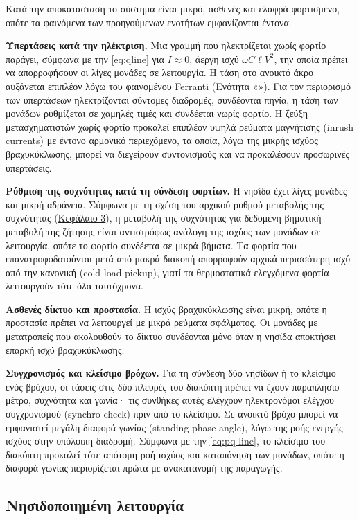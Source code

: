 Κατά την αποκατάσταση το σύστημα είναι μικρό, ασθενές και ελαφρά φορτισμένο, οπότε τα
φαινόμενα των προηγούμενων ενοτήτων εμφανίζονται έντονα.

\textbf{Υπερτάσεις κατά την ηλέκτριση.} Μια γραμμή που ηλεκτρίζεται χωρίς φορτίο παράγει,
σύμφωνα με την \eqref{eq:qline} για $I \approx 0$, άεργη ισχύ $\omega C \ell V^2$, την οποία
πρέπει να απορροφήσουν οι λίγες μονάδες σε λειτουργία. Η τάση στο ανοικτό άκρο αυξάνεται
επιπλέον λόγω του φαινομένου Ferranti (Ενότητα «»). Για τον περιορισμό
των υπερτάσεων ηλεκτρίζονται σύντομες διαδρομές, συνδέονται πηνία, η τάση των μονάδων
ρυθμίζεται σε χαμηλές τιμές και συνδέεται νωρίς φορτίο. Η ζεύξη μετασχηματιστών χωρίς φορτίο
προκαλεί επιπλέον υψηλά ρεύματα μαγνήτισης (inrush currents) με έντονο αρμονικό περιεχόμενο, τα οποία, λόγω της
μικρής ισχύος βραχυκύκλωσης, μπορεί να διεγείρουν συντονισμούς και να προκαλέσουν προσωρινές
υπερτάσεις.

\textbf{Ρύθμιση της συχνότητας κατά τη σύνδεση φορτίων.} Η νησίδα έχει λίγες μονάδες και μικρή
αδράνεια. Σύμφωνα με τη σχέση του αρχικού ρυθμού μεταβολής της συχνότητας
(\hyperref[kef-03-theoria]{Κεφάλαιο 3}), η μεταβολή της συχνότητας για δεδομένη βηματική
μεταβολή της ζήτησης είναι αντιστρόφως ανάλογη της ισχύος των μονάδων σε λειτουργία, οπότε το
φορτίο συνδέεται σε μικρά βήματα. Τα φορτία που επανατροφοδοτούνται μετά από μακρά διακοπή
απορροφούν αρχικά περισσότερη ισχύ από την κανονική (cold load pickup), γιατί τα θερμοστατικά
ελεγχόμενα φορτία λειτουργούν τότε όλα ταυτόχρονα.

\textbf{Ασθενές δίκτυο και προστασία.} Η ισχύς βραχυκύκλωσης είναι μικρή, οπότε η προστασία
πρέπει να λειτουργεί με μικρά ρεύματα σφάλματος. Οι μονάδες με
μετατροπείς που ακολουθούν το δίκτυο συνδέονται μόνο όταν η νησίδα αποκτήσει επαρκή ισχύ
βραχυκύκλωσης.

\textbf{Συγχρονισμός και κλείσιμο βρόχων.} Για τη σύνδεση δύο νησίδων ή το κλείσιμο ενός
βρόχου, οι τάσεις στις δύο πλευρές του διακόπτη πρέπει να έχουν παραπλήσιο μέτρο, συχνότητα και
γωνία· τις συνθήκες αυτές ελέγχουν ηλεκτρονόμοι ελέγχου συγχρονισμού (synchro-check) πριν από
το κλείσιμο. Σε ανοικτό βρόχο μπορεί να εμφανιστεί μεγάλη διαφορά γωνίας (standing phase
angle), λόγω της ροής ενεργής ισχύος στην υπόλοιπη διαδρομή. Σύμφωνα με την
\eqref{eq:pq-line}, το κλείσιμο του διακόπτη προκαλεί τότε απότομη ροή ισχύος και καταπόνηση
των μονάδων, οπότε η διαφορά γωνίας περιορίζεται πρώτα με ανακατανομή της παραγωγής.

\subsection{Νησιδοποιημένη λειτουργία}
\label{sec:island}

